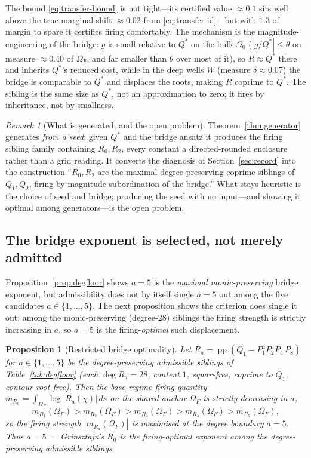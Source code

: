 \documentclass[11pt,reqno]{amsart}
\theoremstyle{plain}
\newtheorem{proposition}[theorem]{Proposition}
\theoremstyle{definition}
\theoremstyle{remark}
\newtheorem{remark}[theorem]{Remark}
\DeclareMathOperator{\pp}{pp}
\begin{document}
The bound \eqref{eq:transfer-bound} is not tight---its certified value $\approx0.1$
sits well above the true marginal shift $\approx0.02$ from
\eqref{eq:transfer-id}---but with $1.3$ of margin to spare it certifies firing
comfortably. The mechanism is the magnitude-engineering of the bridge: $g$ is small
relative to $Q^*$ on the bulk
$\Omega_0$ ($|g/Q^*|\le\theta$ on measure $\approx0.40$ of $\Omega_F$, and far smaller
than $\theta$ over most of it), so $R\approx Q^*$ there and inherits $Q^*$'s reduced
cost, while in the deep wells $W$ (measure $\delta\approx0.07$) the bridge is comparable
to $Q^*$ and displaces the roots, making $R$ coprime to $Q^*$. The sibling is the same
size as $Q^*$, not an approximation to zero; it fires by inheritance, not by smallness.

\begin{remark}[What is generated, and the open problem]\label{rem:gen-scope}
Theorem~\ref{thm:generator} generates \emph{from a seed}: given $Q^*$ and the bridge
ansatz it produces the firing sibling family containing $R_0,R_2$, every constant a
directed-rounded enclosure rather than a grid reading. It converts the diagnosis of
Section~\ref{sec:record} into the construction ``$R_0,R_2$ are the maximal
degree-preserving coprime siblings of $Q_1,Q_2$, firing by magnitude-subordination of
the bridge.'' What stays heuristic is the choice of seed and bridge; producing the seed
with no input---and showing it optimal among generators---is the open problem.
\end{remark}

\subsection*{The bridge exponent is selected, not merely admitted}
Proposition~\ref{prop:degfloor} shows $a=5$ is the \emph{maximal monic-preserving}
bridge exponent, but admissibility does not by itself single $a=5$ out among the five
candidates $a\in\{1,\dots,5\}$. The next proposition shows the criterion does single it
out: among the monic-preserving (degree-$28$) siblings the firing strength is strictly
increasing in $a$, so $a=5$ is the firing-\emph{optimal} such displacement.

\begin{proposition}[Restricted bridge optimality]
\label{prop:restricted-opt}
Let $R_a=\pp(Q_1-P_1^aP_2^aP_4\,P_8)$ for $a\in\{1,\dots,5\}$ be the degree-preserving
admissible siblings of Table~\ref{tab:degfloor} (each $\deg R_a=28$, content $1$,
squarefree, coprime to $Q_1$, contour-root-free). Then the base-regime firing quantity
$m_{R_a}=\int_{\Omega_F}\log|R_a(\chi)|\,ds$ on the shared anchor $\Omega_F$ is strictly
decreasing in $a$,
\[
  m_{R_1}(\Omega_F)>m_{R_2}(\Omega_F)>m_{R_3}(\Omega_F)
  >m_{R_4}(\Omega_F)>m_{R_5}(\Omega_F),
\]
so the firing strength $|m_{R_a}(\Omega_F)|$ is maximised at the degree boundary
$a=5$. Thus $a=5=$ Grinsztajn's $R_0$ is the firing-optimal exponent among the
degree-preserving admissible siblings.
\end{proposition}
\end{document}
